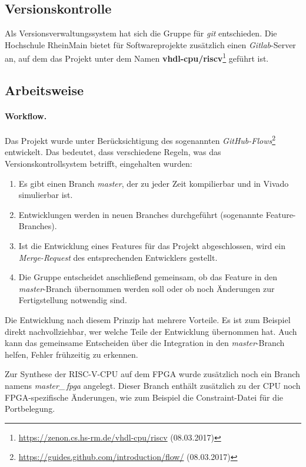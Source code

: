 \subsection{Versionskontrolle}
Als Versionsverwaltungssystem hat sich die Gruppe für \emph{git}
entschieden. Die Hochschule RheinMain bietet für Softwareprojekte
zusätzlich einen \emph{Gitlab}-Server an, auf dem das Projekt unter
dem Namen
\textbf{vhdl-cpu/riscv}\footnote{\url{https://zenon.cs.hs-rm.de/vhdl-cpu/riscv}
(08.03.2017)} geführt ist.

\subsection{Arbeitsweise}

\paragraph{Workflow.} Das Projekt wurde unter Berücksichtigung des sogenannten
\emph{GitHub-Flows}\footnote{\url{https://guides.github.com/introduction/flow/}
(08.03.2017)}
entwickelt. Das bedeutet, dass verschiedene Regeln, was das 
Versionskontrollsystem betrifft, eingehalten wurden:

\begin{enumerate}
\item Es gibt einen Branch \emph{master}, der zu jeder Zeit kompilierbar
und in Vivado simulierbar ist.
\item Entwicklungen werden in neuen Branches durchgeführt (sogenannte
Feature-Branches).
\item Ist die Entwicklung eines Features für das Projekt abgeschlossen,
wird ein \emph{Merge-Request} des entsprechenden Entwicklers gestellt.
\item Die Gruppe entscheidet anschließend gemeinsam, ob das Feature in
den \emph{master}-Branch übernommen werden soll oder ob noch Änderungen
zur Fertigstellung notwendig sind.
\end{enumerate}

Die Entwicklung nach diesem Prinzip hat mehrere Vorteile. Es ist zum
Beispiel direkt nachvollziehbar, wer welche Teile der Entwicklung
übernommen hat. Auch kann das gemeinsame Entscheiden über die Integration in
den \emph{master}-Branch helfen, Fehler frühzeitig zu erkennen.

Zur Synthese der RISC-V-CPU auf dem FPGA wurde zusätzlich noch ein Branch
namens \emph{master\_\,fpga} angelegt. Dieser Branch enthält zusätzlich zu
der CPU noch FPGA-spezifische Änderungen, wie zum Beispiel die
Constraint-Datei für die Portbelegung.

